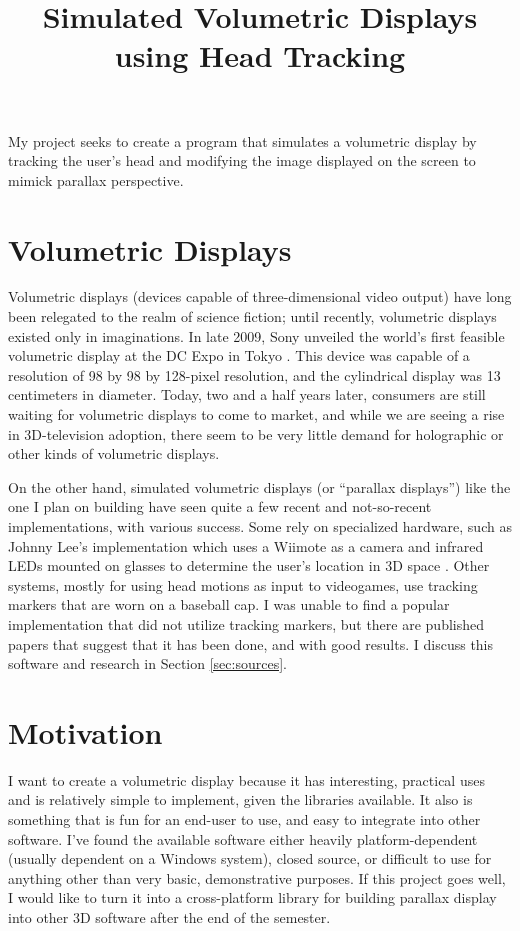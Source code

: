 
\title{Simulated Volumetric Displays using Head Tracking}

\maketitle

My project seeks to create a program that simulates a volumetric
display by tracking the user's head and modifying the image displayed
on the screen to mimick parallax perspective. 

\section{Volumetric Displays}
Volumetric displays (devices capable of three-dimensional video
output) have long been relegated to the realm of science fiction;
until recently, volumetric displays existed only in imaginations. In
late 2009, Sony unveiled the world's first feasible volumetric display
at the DC Expo in Tokyo \citep{sonydisplay}. This device was capable
of a resolution of 98 by 98 by 128-pixel resolution, and the
cylindrical display was 13 centimeters in diameter. Today, two and a
half years later, consumers are still waiting for volumetric displays
to come to market, and while we are seeing a rise in 3D-television
adoption, there seem to be very little demand for holographic or other
kinds of volumetric displays.

On the other hand, simulated volumetric displays (or ``parallax
displays'') like the one I plan on building have seen quite a few
recent and not-so-recent implementations, with various success. Some
rely on specialized hardware, such as Johnny Lee's implementation
which uses a Wiimote as a camera and infrared LEDs mounted on glasses
to determine the user's location in 3D space \citep{wiiproject}. Other
systems, mostly for using head motions as input to videogames, use
tracking markers that are worn on a baseball cap. I was unable to find
a popular implementation that did not utilize tracking markers, but
there are published papers that suggest that it has been done, and
with good results. I discuss this software and research in Section
\ref{sec:sources}.

\section{Motivation}
I want to create a volumetric display because it has interesting,
practical uses and is relatively simple to implement, given the
libraries available. It also is something that is fun for an end-user
to use, and easy to integrate into other software. I've found the
available software either heavily platform-dependent (usually
dependent on a Windows system), closed source, or difficult to use for
anything other than very basic, demonstrative purposes. If this
project goes well, I would like to turn it into a cross-platform
library for building parallax display into other 3D software after the
end of the semester. 

